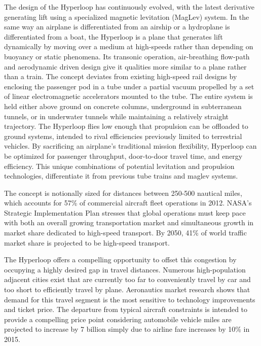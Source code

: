 	The design of the Hyperloop has continuously evolved, with the latest derivative
	generating lift using a specialized magnetic levitation (MagLev) system.
	In the same way an airplane is differentiated from an airship or a hydroplane is differentiated from
	a boat, the Hyperloop is a plane that generates lift dynamically
	by moving over a medium at high-speeds
	rather than depending on buoyancy or static phenomena.
	Its transonic operation, air-breathing flow-path and aerodynamic
	driven design give it qualities more similar to a plane rather than a train.
	The concept deviates from existing high-speed rail designs by enclosing the passenger pod in a tube under a partial vacuum
	propelled by a set of linear electromagnetic accelerators
	mounted to the tube. The entire system is held either above ground on concrete
	columns, underground in subterranean tunnels, or in underwater tunnels while maintaining a relatively straight trajectory.
	The Hyperloop flies low enough that propulsion can be offloaded to ground systems,
	intended to rival efficiencies previously limited to terrestrial vehicles.
	By sacrificing an airplane's traditional mission flexibility,
	Hyperloop can be optimized for passenger throughput, door-to-door travel time,
	and energy efficiency.
	This unique combinations of potential levitation and propulsion technologies,
	differentiate it from previous tube trains and maglev systems.

	The concept is notionally sized for distances between 250-500 nautical miles,
	which accounts for 57\% of commercial aircraft fleet operations in 2012. NASA's
	Strategic Implementation Plan stresses that global operations must keep pace with both an overall growing
	transportation market and simultaneous growth in market share dedicated to high-speed transport.
	By 2050, 41\% of world traffic market share is projected to be high-speed transport. \cite{Schafer}

	The Hyperloop offers a compelling opportunity to offset this congestion
	by occupying a highly desired gap in travel distances.
	Numerous high-population adjacent cities exist that are currently
	too far to conveniently travel by car and too short to efficiently travel by plane.
	Aeronautics market research shows that demand for this travel segment is
	the most sensitive to technology improvements and ticket price.\cite{Baik}
	The departure from typical aircraft constraints is intended to provide a
	compelling price point considering automobile vehicle miles are
	projected to increase by 7 billion simply due to airline
	fare increases by 10\% in 2015.

